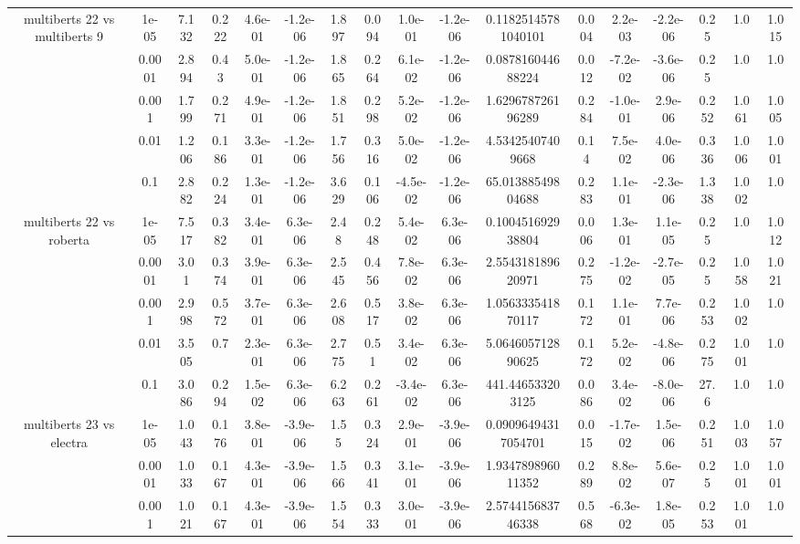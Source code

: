 \begin{tabular}{|c|c|c|c|c|c|c|c|c|c|c|c|c|c|c|c|c|}
\hline
\multirow{5}{*}{multiberts 22 vs multiberts 9} & 1e-05 & 7.132 & 0.222 & 4.6e-01 & -1.2e-06 & 1.897 & 0.094 & 1.0e-01 & -1.2e-06 & 0.11825145781040101 & 0.004 & 2.2e-03 & -2.2e-06 & 0.25 & 1.0 & 1.015 \\
 & 0.0001 & 2.894 & 0.43 & 5.0e-01 & -1.2e-06 & 1.865 & 0.264 & 6.1e-02 & -1.2e-06 & 0.087816044688224 & 0.012 & -7.2e-02 & -3.6e-06 & 0.25 & 1.0 & 1.0 \\
 & 0.001 & 1.799 & 0.271 & 4.9e-01 & -1.2e-06 & 1.851 & 0.298 & 5.2e-02 & -1.2e-06 & 1.629678726196289 & 0.284 & -1.0e-01 & 2.9e-06 & 0.252 & 1.061 & 1.005 \\
 & 0.01 & 1.206 & 0.186 & 3.3e-01 & -1.2e-06 & 1.756 & 0.316 & 5.0e-02 & -1.2e-06 & 4.53425407409668 & 0.14 & 7.5e-02 & 4.0e-06 & 0.336 & 1.006 & 1.001 \\
 & 0.1 & 2.882 & 0.224 & 1.3e-01 & -1.2e-06 & 3.629 & 0.106 & -4.5e-02 & -1.2e-06 & 65.01388549804688 & 0.283 & 1.1e-01 & -2.3e-06 & 1.338 & 1.002 & 1.0 \\
\hline
\multirow{5}{*}{multiberts 22 vs roberta } & 1e-05 & 7.517 & 0.382 & 3.4e-01 & 6.3e-06 & 2.48 & 0.248 & 5.4e-02 & 6.3e-06 & 0.100451692938804 & 0.006 & 1.3e-01 & 1.1e-05 & 0.25 & 1.0 & 1.012 \\
 & 0.0001 & 3.01 & 0.374 & 3.9e-01 & 6.3e-06 & 2.545 & 0.456 & 7.8e-02 & 6.3e-06 & 2.554318189620971 & 0.275 & -1.2e-02 & -2.7e-05 & 0.25 & 1.058 & 1.021 \\
 & 0.001 & 2.998 & 0.572 & 3.7e-01 & 6.3e-06 & 2.608 & 0.517 & 3.8e-02 & 6.3e-06 & 1.056333541870117 & 0.172 & 1.1e-01 & 7.7e-06 & 0.253 & 1.002 & 1.0 \\
 & 0.01 & 3.505 & 0.7 & 2.3e-01 & 6.3e-06 & 2.775 & 0.51 & 3.4e-02 & 6.3e-06 & 5.064605712890625 & 0.172 & 5.2e-02 & -4.8e-06 & 0.275 & 1.001 & 1.0 \\
 & 0.1 & 3.086 & 0.294 & 1.5e-02 & 6.3e-06 & 6.263 & 0.261 & -3.4e-02 & 6.3e-06 & 441.446533203125 & 0.086 & 3.4e-02 & -8.0e-06 & 27.6 & 1.0 & 1.0 \\
\hline
\multirow{5}{*}{multiberts 23 vs electra } & 1e-05 & 1.043 & 0.176 & 3.8e-01 & -3.9e-06 & 1.55 & 0.324 & 2.9e-01 & -3.9e-06 & 0.09096494317054701 & 0.015 & -1.7e-02 & 1.5e-06 & 0.251 & 1.003 & 1.057 \\
 & 0.0001 & 1.033 & 0.167 & 4.3e-01 & -3.9e-06 & 1.566 & 0.341 & 3.1e-01 & -3.9e-06 & 1.934789896011352 & 0.289 & 8.8e-02 & 5.6e-07 & 0.25 & 1.001 & 1.001 \\
 & 0.001 & 1.021 & 0.167 & 4.3e-01 & -3.9e-06 & 1.554 & 0.333 & 3.0e-01 & -3.9e-06 & 2.574415683746338 & 0.568 & -6.3e-02 & 1.8e-05 & 0.253 & 1.001 & 1.0 \\

\end{tabular}
